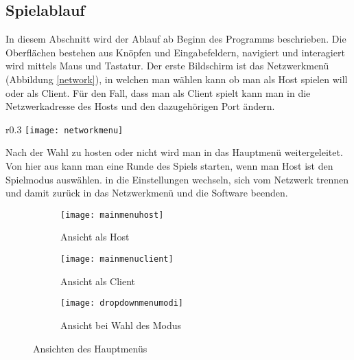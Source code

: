 \subsection{Spielablauf}
In diesem Abschnitt wird der Ablauf ab Beginn des Programms beschrieben. Die Oberflächen bestehen aus Knöpfen und Eingabefeldern, navigiert und interagiert wird mittels Maus und Tastatur. Der erste Bildschirm ist das Netzwerkmenü (Abbildung \ref{network}), in welchen man wählen kann ob man als Host spielen will oder als Client. Für den Fall, dass man als Client spielt kann man in die Netzwerkadresse des Hosts und den dazugehörigen Port ändern.
\begin{wrapfigure}{r}{0.3\textwidth}
	\centering
	\texttt{[image: networkmenu]}
    \caption{Netwerkmenü}
    \label{network}
\end{wrapfigure}
\newline
Nach der Wahl zu hosten oder nicht wird man in das Hauptmenü weitergeleitet. Von hier aus kann man eine Runde des Spiels starten, wenn man Host ist den Spielmodus auswählen. in die Einstellungen wechseln, sich vom Netzwerk trennen und damit zurück in das Netzwerkmenü und die Software beenden.\newline
\begin{figure}[b]
	\centering
    \begin{subfigure}[a]{0.3\linewidth}
    	\texttt{[image: mainmenuhost]}
    	\caption{Ansicht als Host}
        \label{fig:menuhost}
    \end{subfigure}
    \begin{subfigure}[a]{0.3\linewidth}
    	\texttt{[image: mainmenuclient]}
    	\caption{Ansicht als Client}
        \label{fig:menuclient}
    \end{subfigure}
    \begin{subfigure}[a]{0.3\linewidth}
    	\texttt{[image: dropdownmenumodi]}
    	\caption{Ansicht bei Wahl des Modus}
        \label{fig:menumodi}
    \end{subfigure}
    \caption{Ansichten des Hauptmenüs}
    \label{menu}
\end{figure}
